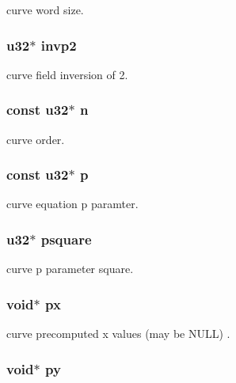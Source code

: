 curve word size. \hypertarget{struct__t__curve_af069f02c44aabbf48a58630e66a45881}{
\subsubsection[{invp2}]{\setlength{\rightskip}{0pt plus 5cm}u32$\ast$ invp2}}\label{struct__t__curve_af069f02c44aabbf48a58630e66a45881}
curve field inversion of 2. \hypertarget{struct__t__curve_a47b7adf4fa2a08459833020659e6a504}{
\subsubsection[{n}]{\setlength{\rightskip}{0pt plus 5cm}const u32$\ast$ n}}\label{struct__t__curve_a47b7adf4fa2a08459833020659e6a504}
curve order. \hypertarget{struct__t__curve_ad19e9ad5fa75d3a5f3e691c3ed9627b5}{
\subsubsection[{p}]{\setlength{\rightskip}{0pt plus 5cm}const u32$\ast$ p}}\label{struct__t__curve_ad19e9ad5fa75d3a5f3e691c3ed9627b5}
curve equation p paramter. \hypertarget{struct__t__curve_adb489f0d60e4689407b67e1b45cb1848}{
\subsubsection[{psquare}]{\setlength{\rightskip}{0pt plus 5cm}u32$\ast$ psquare}}\label{struct__t__curve_adb489f0d60e4689407b67e1b45cb1848}
curve p parameter square. \hypertarget{struct__t__curve_affdf78baef4434da522f1b63632bd17e}{
\subsubsection[{px}]{\setlength{\rightskip}{0pt plus 5cm}void$\ast$ px}}\label{struct__t__curve_affdf78baef4434da522f1b63632bd17e}
curve precomputed x values (may be N\+U\+L\+L) . \hypertarget{struct__t__curve_aed69d60ec1a2d98bd79d9d35386558eb}{
\subsubsection[{py}]{\setlength{\rightskip}{0pt plus 5cm}void$\ast$ py}}\label{struct__t__curve_aed69d60ec1a2d98bd79d9d35386558eb}
